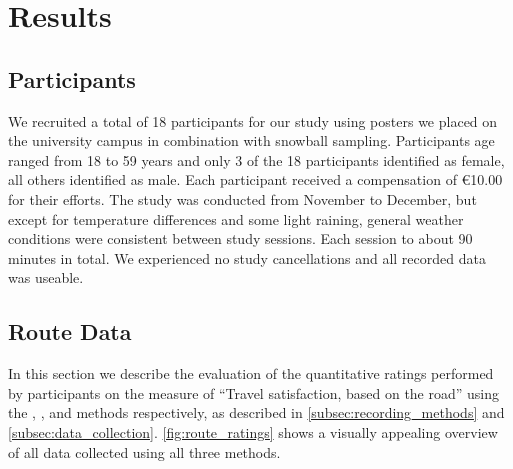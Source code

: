 \section{Results}\label{sec:results}

\subsection{Participants}

We recruited a total of 18 participants for our study using posters we placed on the university campus in combination with snowball sampling.
Participants age ranged from 18 to 59 years and only 3 of the 18 participants identified as female, all others identified as male.
Each participant received a compensation of \euro10.00 for their efforts.
The study was conducted from November to December, but except for temperature differences and some light raining, general weather conditions were consistent between study sessions.
Each session to about 90 minutes in total.
We experienced no study cancellations and all recorded data was useable.

\subsection{Route Data}

In this section we describe the evaluation of the quantitative ratings performed by participants on the measure of “Travel satisfaction, based on the road” using the \likertshift, \audiorecording, and \mapping methods respectively, as described in \autoref{subsec:recording_methods} and \autoref{subsec:data_collection}. \autoref{fig:route_ratings} shows a visually appealing overview of all data collected using all three methods.

